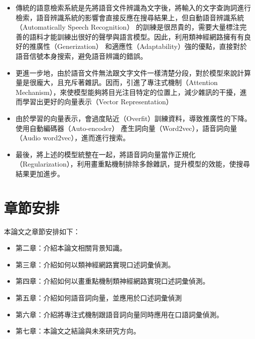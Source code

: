 \begin{itemize}
\itemsep -2pt %
  \item
	  傳統的語意檢索系統是先將語音文件辨識為文字後，將輸入的文字查詢詞進行檢索，語音辨識系統的影響會直接反應在搜尋結果上，但自動語音辨識系統（Automatically Speech Recognition）
的訓練是很昂貴的，需要大量標注完善的語料才能訓練出很好的聲學與語言模型。因此，利用類神經網路擁有有良好的推廣性（Generization）
和適應性（Adaptability）強的優點，直接對於語音信號本身搜索，避免語音辨識的錯誤。
  \item
	  更進一步地，由於語音文件無法跟文字文件一樣清楚分段，對於模型來說計算量是很龐大，且充斥著雜訊。因而，引進了專注式機制（Attention
	  Mechanism），來使模型能夠將目光注目特定的位置上，減少雜訊的干擾，進而學習出更好的向量表示（Vector Representation）
  \item
	  由於學習的向量表示，會過度貼近（Overfit）訓練資料，導致推廣性的下降。使用自動編碼器（Auto-encoder）\cite{vincent2008extracting,li2015hierarchical,baldi2012autoencoders}
	  產生詞向量（Word2vec），語音詞向量（Audio word2vec）\cite{mikolov2013distributed,mikolov2013efficient,pennington2014glove,chung2016audio}，進而進行搜索。
  \item
	  最後，將上述的模型統整在一起，將語音詞向量當作正規化（Regularization），利用畫重點機制排除多餘雜訊，提升模型的效能，使搜尋結果更加進步。

\end{itemize}

\section{章節安排}
本論文之章節安排如下：

\begin{itemize}
\itemsep -2pt %
  \item  第二章：介紹本論文相關背景知識。
  \item  第三章：介紹如何以類神經網路實現口述詞彙偵測。
  \item  第四章：介紹如何以畫重點機制類神經網路實現口述詞彙偵測。
  \item  第五章：介紹如何語音詞向量，並應用於口述詞彙偵測
  \item  第六章：介紹將專注式機制跟語音詞向量同時應用在口語詞彙偵測。
  \item  第七章：本論文之結論與未來研究方向。
\end{itemize}

